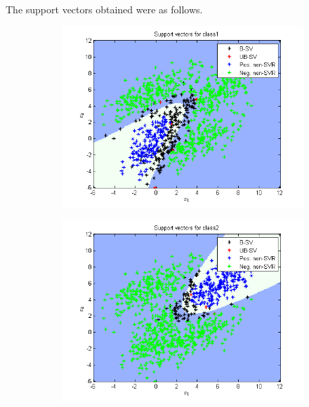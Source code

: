 \documentclass{article}
\begin{document}
The support vectors obtained were as follows.
\begin{figure}
\begin{subfigure}{.5\textwidth}
  \centering
  \includegraphics[width=.8\linewidth]{Classification/1c/c_poly/sv1}
 
\end{subfigure}%
\begin{subfigure}{.5\textwidth}
  \centering
  \includegraphics[width=.8\linewidth]{Classification/1c/c_poly/sv2}
  
\end{subfigure}
\end{figure}
\end{document}

